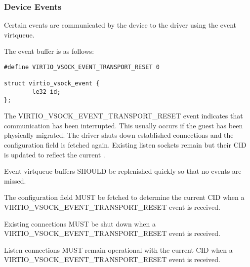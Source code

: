 \subsubsection{Device Events}\label{sec:Device Types / Socket Device / Device Operation / Device Events}

Certain events are communicated by the device to the driver using the event
virtqueue.

The event buffer is as follows:

\begin{lstlisting}
#define VIRTIO_VSOCK_EVENT_TRANSPORT_RESET 0

struct virtio_vsock_event {
        le32 id;
};
\end{lstlisting}

The VIRTIO_VSOCK_EVENT_TRANSPORT_RESET event indicates that communication has
been interrupted.  This usually occurs if the guest has been physically
migrated.  The driver shuts down established connections and the
 configuration field is fetched again.  Existing listen
sockets remain but their CID is updated to reflect the current
.


Event virtqueue buffers SHOULD be replenished quickly so that no events are
missed.

The  configuration field MUST be fetched to determine the
current CID when a VIRTIO_VSOCK_EVENT_TRANSPORT_RESET event is received.

Existing connections MUST be shut down when a
VIRTIO_VSOCK_EVENT_TRANSPORT_RESET event is received.

Listen connections MUST remain operational with the current CID when a
VIRTIO_VSOCK_EVENT_TRANSPORT_RESET event is received.
